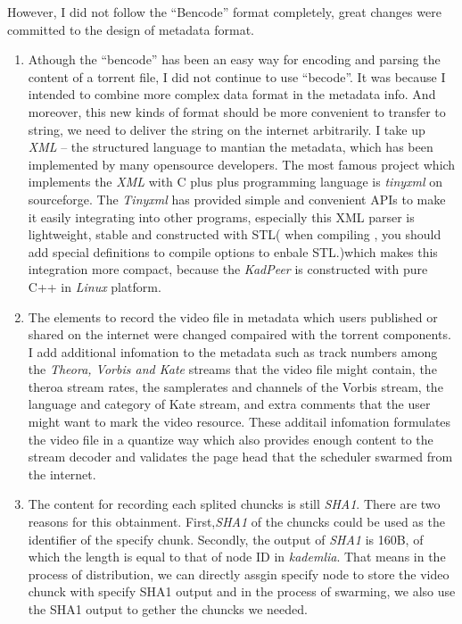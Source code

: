 {However, I did not follow the ``Bencode'' format completely, great changes were committed to the design of metadata format.
\begin{enumerate}
\item Athough the ``bencode'' has been an easy way for encoding and parsing the content of a torrent file, I did not continue to use ``becode''. 
It was because I intended to combine more complex data format in the metadata info. And moreover, this new kinds of format should be more convenient to  transfer to string, we need to deliver the string on the internet arbitrarily. 
I take up \emph{XML} -- the structured language to mantian the metadata, which has been implemented by many opensource developers.
The most famous project which implements the \emph{XML} with C plus plus programming language is \emph{tinyxml} on sourceforge\cite{tinyxml}. 
The \emph{Tinyxml} has provided simple and convenient APIs to make it easily integrating into other programs, especially this XML parser is lightweight, stable and constructed with STL( when compiling , you should add special definitions to compile options to enbale STL.)which makes this integration more compact, because the \emph{KadPeer} is constructed with pure C++ in \emph{Linux } platform.
\item The elements to record the video file in metadata which users published or shared on the internet were changed compaired with the torrent components. 
I add additional infomation to the metadata such as track numbers among the \emph{Theora, Vorbis and Kate} streams that the video file might contain, the theroa stream rates, the samplerates and channels of the Vorbis stream, the language and category of Kate stream, and extra comments that the user might want to mark the video resource.
These additail infomation formulates the video file in a quantize way which also provides enough content to the stream decoder and validates the page head that the scheduler swarmed from the internet.
\item The content for recording each splited chuncks is still \emph{SHA1}.
There are two reasons for this obtainment. 
First,\emph{SHA1} of the chuncks could be used as the identifier of the specify chunk.
Secondly, the output of \emph{SHA1} is 160B, of which the length is equal to that of  node ID in \emph{kademlia}.
That means in the process of distribution, we can directly assgin specify node to store the video chunck with specify SHA1 output and in the process of swarming, we also use the SHA1 output to gether the chuncks we needed.
\end{enumerate}

%
}


